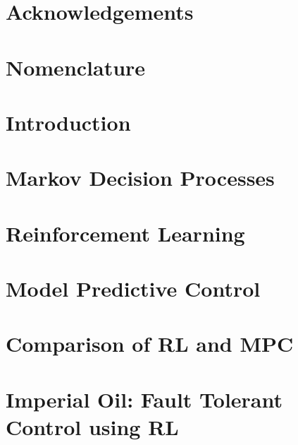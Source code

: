 \documentclass[12pt]{report}
\begin{document}
\tableofcontents
\listoffigures
\listoftables

\chapter*{Acknowledgements}

\chapter*{Nomenclature}

\chapter{Introduction}


\chapter{Markov Decision Processes}


\chapter{Reinforcement Learning}


\chapter{Model Predictive Control}


\chapter{Comparison of RL and MPC}


\chapter{Imperial Oil: Fault Tolerant Control using RL}


\printbibliography
\end{document}
